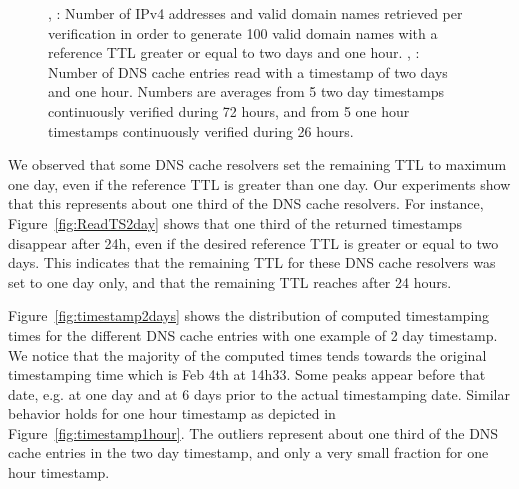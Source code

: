 \begin{figure*}
\begin{center}
\caption{, :  Number of IPv4 addresses and valid domain names retrieved per verification in order to generate 100 valid domain names with a reference TTL greater or equal to  two days and  one hour. , :  Number of DNS cache entries read with a timestamp of  two days and  one hour. Numbers are averages from 5 two day timestamps  continuously verified during 72 hours, and from 5 one hour timestamps  continuously verified during 26 hours.}
\end{center}
\end{figure*}

We observed that some DNS cache resolvers set the remaining TTL to maximum one day, even if the reference TTL is greater than one day. Our experiments show that this represents about one third of the DNS cache resolvers. For instance, Figure~\ref{fig:ReadTS2day} shows that one third of the returned timestamps disappear after 24h, even if the desired reference TTL is greater or equal to two days. This indicates that the remaining TTL for these DNS cache resolvers was set to one day only, and that the remaining TTL reaches  after 24 hours.

Figure~\ref{fig:timestamp2days} shows the distribution of computed timestamping times for the different DNS cache entries with one example of 2 day timestamp. We notice that the majority of the computed times tends towards the original timestamping time which is Feb 4th at 14h33. Some peaks appear before that date, e.g. at one day and at 6 days prior to the actual timestamping date. Similar behavior holds for one hour timestamp as depicted in Figure~\ref{fig:timestamp1hour}. The outliers represent about one third of the DNS cache entries in the two day timestamp, and only a very small fraction for one hour timestamp.

